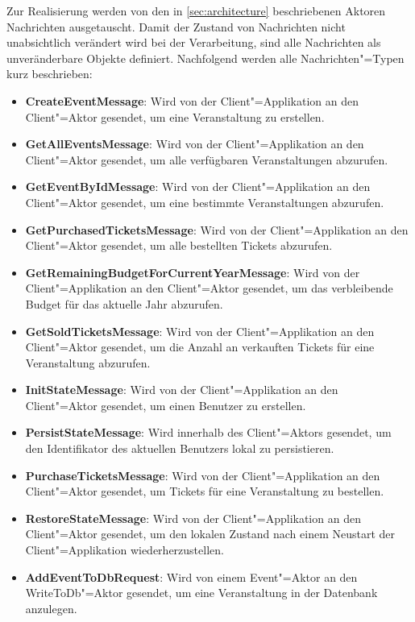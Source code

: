 Zur Realisierung werden von den in \autoref{sec:architecture} beschriebenen Aktoren Nachrichten ausgetauscht.
Damit der Zustand von Nachrichten nicht unabsichtlich verändert wird bei der Verarbeitung, sind alle Nachrichten als unveränderbare Objekte definiert.
Nachfolgend werden alle Nachrichten"=Typen kurz beschrieben:

\begin{itemize}[itemsep=-.5em,leftmargin=*]
    \item \textbf{CreateEventMessage}: Wird von der Client"=Applikation an den Client"=Aktor gesendet, um eine Veranstaltung zu erstellen.
    \item \textbf{GetAllEventsMessage}: Wird von der Client"=Applikation an den Client"=Aktor gesendet, um alle verfügbaren Veranstaltungen abzurufen.
    \item \textbf{GetEventByIdMessage}: Wird von der Client"=Applikation an den Client"=Aktor gesendet, um eine bestimmte Veranstaltungen abzurufen.
    \item \textbf{GetPurchasedTicketsMessage}: Wird von der Client"=Applikation an den Client"=Aktor gesendet, um alle bestellten Tickets abzurufen.
    \item \textbf{GetRemainingBudgetForCurrentYearMessage}: Wird von der Client"=Applikation an den Client"=Aktor gesendet, um das verbleibende Budget für das aktuelle Jahr abzurufen.
    \item \textbf{GetSoldTicketsMessage}: Wird von der Client"=Applikation an den Client"=Aktor gesendet, um die Anzahl an verkauften Tickets für eine Veranstaltung abzurufen.
    \item \textbf{InitStateMessage}: Wird von der Client"=Applikation an den Client"=Aktor gesendet, um einen Benutzer zu erstellen.
    \item \textbf{PersistStateMessage}: Wird innerhalb des Client"=Aktors gesendet, um den Identifikator des aktuellen Benutzers lokal zu persistieren.
    \item \textbf{PurchaseTicketsMessage}: Wird von der Client"=Applikation an den Client"=Aktor gesendet, um Tickets für eine Veranstaltung zu bestellen.
    \item \textbf{RestoreStateMessage}: Wird von der Client"=Applikation an den Client"=Aktor gesendet, um den lokalen Zustand nach einem Neustart der Client"=Applikation wiederherzustellen.
    \item \textbf{AddEventToDbRequest}: Wird von einem Event"=Aktor an den WriteToDb"=Aktor gesendet, um eine Veranstaltung in der Datenbank anzulegen.

\end{itemize}
